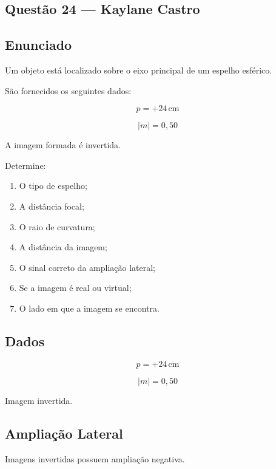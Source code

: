 \documentclass[12pt,a4paper]{article}
\begin{document}
\subsection{Questão 24 — Kaylane Castro}

\subsection*{Enunciado}

Um objeto está localizado sobre o eixo principal de um espelho esférico.

São fornecidos os seguintes dados:

\[
p = +24\,\text{cm}
\]

\[
|m| = 0,50
\]

A imagem formada é invertida.

Determine:

\begin{enumerate}
    \item[\textbf{(a)}] O tipo de espelho;
    \item[\textbf{(b)}] A distância focal;
    \item[\textbf{(c)}] O raio de curvatura;
    \item[\textbf{(e)}] A distância da imagem;
    \item[\textbf{(f)}] O sinal correto da ampliação lateral;
    \item[\textbf{(g)}] Se a imagem é real ou virtual;
    \item[\textbf{(i)}] O lado em que a imagem se encontra.
\end{enumerate}


\subsection*{Dados}

\[
p = +24\,\text{cm}
\]

\[
|m| = 0,50
\]

Imagem invertida.


\subsection*{Ampliação Lateral}

Imagens invertidas possuem ampliação negativa.
\end{document}
